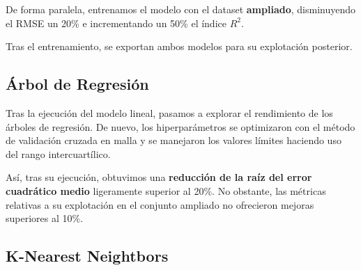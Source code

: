 
De forma paralela, entrenamos el modelo con el dataset \textbf{ampliado}, disminuyendo el RMSE un 20\% e incrementando un 50\% el índice $R^{2}$.

Tras el entrenamiento, se exportan ambos modelos para su explotación posterior.


\subsection{Árbol de Regresión}

Tras la ejecución del modelo lineal, pasamos a explorar el rendimiento de los árboles de regresión.
De nuevo, los hiperparámetros se optimizaron con el método de validación cruzada en malla y se manejaron los valores límites haciendo uso del rango intercuartílico.

Así, tras su ejecución, obtuvimos una \textbf{reducción de la raíz del error cuadrático medio} ligeramente superior al 20\%. No obstante, las métricas relativas a su explotación en el conjunto ampliado no ofrecieron mejoras superiores al 10\%.


\subsection{K-Nearest Neightbors}




 